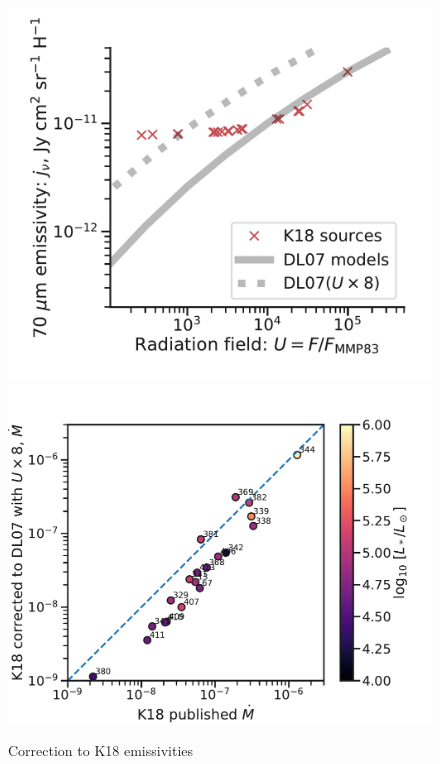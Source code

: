 \begin{figure}
  \centering
  \includegraphics[width=\linewidth]{figs/K18-emissivity-vs-U}
  \includegraphics[width=\linewidth]{figs/K18-mdot-Ux8-comparison}
  \caption{Correction to K18 emissivities}
  \label{fig:k18-emissivity}
\end{figure}


